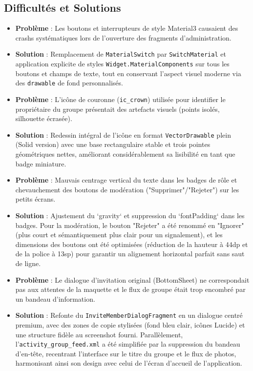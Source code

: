 \documentclass{article}
\begin{document}
\subsection{Difficultés et Solutions}
\begin{itemize}
    \item \textbf{Problème} : Les boutons et interrupteurs de style Material3 causaient des crashs systématiques lors de l'ouverture des fragments d'administration.
    \item \textbf{Solution} : Remplacement de \texttt{MaterialSwitch} par \texttt{SwitchMaterial} et application explicite de styles \texttt{Widget.MaterialComponents} sur tous les boutons et champs de texte, tout en conservant l'aspect visuel moderne via des \texttt{drawable} de fond personnalisés.
    \item \textbf{Problème} : L'icône de couronne (\texttt{ic\_crown}) utilisée pour identifier le propriétaire du groupe présentait des artefacts visuels (points isolés, silhouette écrasée).
    \item \textbf{Solution} : Redessin intégral de l'icône en format \texttt{VectorDrawable} plein (Solid version) avec une base rectangulaire stable et trois pointes géométriques nettes, améliorant considérablement sa lisibilité en tant que badge miniature.
    \item \textbf{Problème} : Mauvais centrage vertical du texte dans les badges de rôle et chevauchement des boutons de modération ("Supprimer"/"Rejeter") sur les petits écrans.
    \item \textbf{Solution} : Ajustement du `gravity` et suppression du `fontPadding` dans les badges. Pour la modération, le bouton "Rejeter" a été renommé en "Ignorer" (plus court et sémantiquement plus clair pour un signalement), et les dimensions des boutons ont été optimisées (réduction de la hauteur à 44dp et de la police à 13sp) pour garantir un alignement horizontal parfait sans saut de ligne.
    \item \textbf{Problème} : Le dialogue d'invitation original (BottomSheet) ne correspondait pas aux attentes de la maquette et le flux de groupe était trop encombré par un bandeau d'information.
    \item \textbf{Solution} : Refonte du \texttt{InviteMemberDialogFragment} en un dialogue centré premium, avec des zones de copie stylisées (fond bleu clair, icônes Lucide) et une structure fidèle au screenshot fourni. Parallèlement, l'\texttt{activity\_group\_feed.xml} a été simplifiée par la suppression du bandeau d'en-tête, recentrant l'interface sur le titre du groupe et le flux de photos, harmonisant ainsi son design avec celui de l'écran d'accueil de l'application.

\end{itemize}
\end{document}
